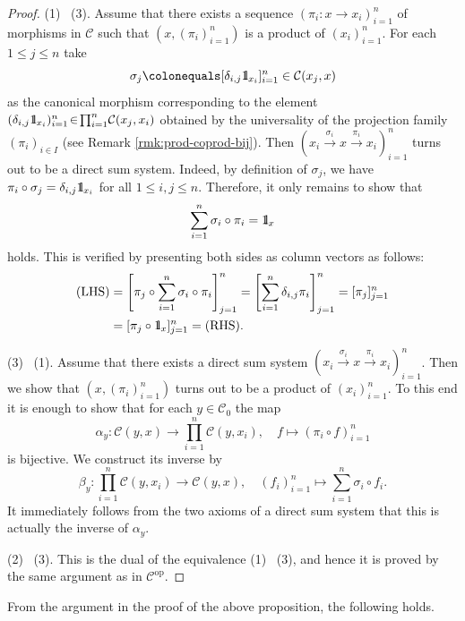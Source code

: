 \documentclass{surv-l}
\numberwithin{equation}{chapter}
\numberwithin{figure}{chapter}
\theoremstyle{plain}
\theoremstyle{definition}
\theoremstyle{remark}
\newcommand{\id}{1\kern-.25em{\text{{\rm l}}}}
\begin{document}
\begin{proof}
(1) \text{$\Rightarrow$}\  (3).
Assume that there exists a sequence $(\pi_i \colon x \to x_i)_{i=1}^n$ of
morphisms in ${\mathcal{C}}$ such that
$(x, (\pi_i)_{i=1}^n)$ is a product of $(x_i)_{i=1}^n$.
For each $1\le j \le n$
take
\[
\sigma_j\colonequals  [\delta_{i,j}\id_{x_i}]_{i=1}^n \in {\mathcal{C}}(x_j, x)
\]
as the canonical morphism
corresponding to the element
{\small$(\delta_{i,j}\id_{x_i})_{i=1}^n \!\in\! \prod_{i=1}^n\!{\mathcal{C}}(x_j, x_i)$}
obtained by the universality of
the projection family $(\pi_i)_{i\in I}$
 (see Remark \ref{rmk:prod-coprod-bij}).
Then $(x_i \xrightarrow{\sigma_i} x \xrightarrow{\pi_i} x_i)_{i=1}^n$ turns out to be a direct sum system.
Indeed,
by definition of $\sigma_j$, we have
$\pi_i\circ \sigma_j = \delta_{i,j}\id_{x_i}$
for all $1 \le i,j \le n$.
Therefore, it only remains to show that
\[
\sum_{i=1}^n \sigma_i\circ \pi_i = \id_x
\]
holds.
This is verified by presenting both sides
as column vectors as follows:
\[
\begin{aligned}
\text{(LHS)}&=
\left[\pi_j\circ\sum_{i=1}^n \sigma_i\circ \pi_i\right]_{j=1}^n
= \left[\sum_{i=1}^n \delta_{i,j} \pi_i\right]_{j=1}^n
=[\pi_j]_{j=1}^n\\
&= [\pi_j\circ \id_x]_{j=1}^n = \text{(RHS)}.
\end{aligned}
\]

(3) \text{$\Rightarrow$}\  (1).
Assume that there exists a direct sum system $(x_i \xrightarrow{\sigma_i} x \xrightarrow{\pi_i} x_i)_{i=1}^n$.
Then we show that
$(x, (\pi_i)_{i=1}^n)$ turns out to be a product of $(x_i)_{i=1}^n$.
To this end it is enough to show that for each $y \in {\mathcal{C}}_0$
the map
\[
\alpha_y\colon {\mathcal{C}}(y, x) \to \prod_{i=1}^n{\mathcal{C}}(y, x_i),\quad f \mapsto (\pi_i\circ f)_{i=1}^n
\]
is bijective.
We construct its inverse by
\[
\beta_y \colon \prod_{i=1}^n{\mathcal{C}}(y, x_i) \to {\mathcal{C}}(y, x),
\quad (f_i)_{i=1}^n \mapsto \sum_{i=1}^n\sigma_i\circ f_i.
\]
It immediately follows from the two axioms of a direct sum system
that this is actually the inverse of $\alpha_y$.

(2) \text{$\Leftrightarrow$}\  (3).
This is the dual of the equivalence (1) \text{$\Leftrightarrow$}\  (3),
and hence it is proved by the same argument as in
${\mathcal{C}}^{\mathrm{op}}$.
\end{proof}

From the argument in the proof of the above proposition, the following holds.
\end{document}
